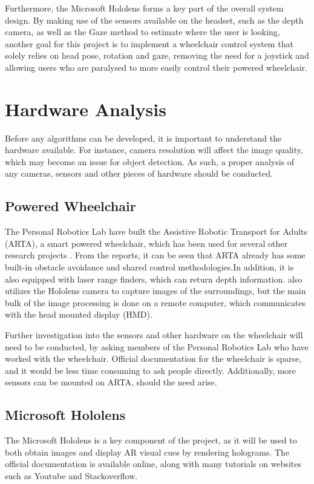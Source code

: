 \documentclass[12pt,a4paper]{report}
\begin{document}
Furthermore, the Microsoft Hololens forms a key part of the overall system design. By making use of the sensors available on the headset, such as the depth camera, as well as the Gaze method to estimate where the user is looking, another goal for this project is to implement a wheelchair control system that solely relies on head pose, rotation and gaze, removing the need for a joystick and allowing users who are paralysed to more easily control their powered wheelchair.

\section{Hardware Analysis}
Before any algorithms can be developed, it is important to understand the hardware available. For instance, camera resolution will affect the image quality, which may become an issue for object detection. As such, a proper analysis of any cameras, sensors and other pieces of hardware should be conducted.

\subsection{Powered Wheelchair}
The Personal Robotics Lab have built the Assistive Robotic Transport for Adults (ARTA), a smart powered wheelchair, which has been used for several other research projects \citep{Chacon-Quesada, Zolotas2018}. From the reports, it can be seen that ARTA already has some built-in obstacle avoidance and shared control methodologies.In addition, it is also equipped with laser range finders, which can return depth information. \cite{Chacon-Quesada} also utilizes the Hololens camera to capture images of the surroundings, but the main bulk of the image processing is done on a remote computer, which communicates with the head mounted display (HMD).

Further investigation into the sensors and other hardware on the wheelchair will need to be conducted, by asking members of the Personal Robotics Lab who have worked with the wheelchair. Official documentation for the wheelchair is sparse, and it would be less time consuming to ask people directly. Additionally, more sensors can be mounted on ARTA, should the need arise.

\subsection{Microsoft Hololens}
The Microsoft Hololens is a key component of the project, as it will be used to both obtain images and display AR visual cues by rendering holograms. The official documentation \citep{Microsofta} is available online, along with many tutorials on websites such as Youtube and Stackoverflow.
\end{document}
